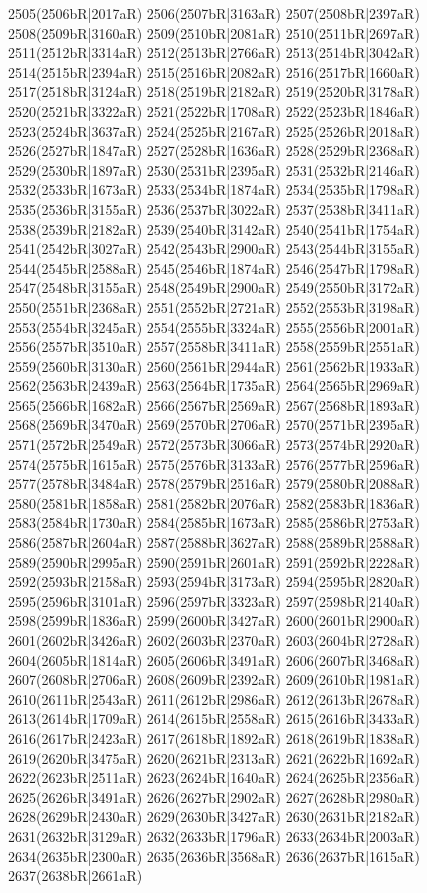 2505(2506bR|2017aR) 2506(2507bR|3163aR) 2507(2508bR|2397aR) 2508(2509bR|3160aR) 2509(2510bR|2081aR) 2510(2511bR|2697aR) \\2511(2512bR|3314aR) 2512(2513bR|2766aR) 2513(2514bR|3042aR) 2514(2515bR|2394aR) 2515(2516bR|2082aR) 2516(2517bR|1660aR) 2517(2518bR|3124aR) 2518(2519bR|2182aR) 2519(2520bR|3178aR) \\2520(2521bR|3322aR) 2521(2522bR|1708aR) 2522(2523bR|1846aR) 2523(2524bR|3637aR) 2524(2525bR|2167aR) 2525(2526bR|2018aR) 2526(2527bR|1847aR) 2527(2528bR|1636aR) 2528(2529bR|2368aR) \\2529(2530bR|1897aR) 2530(2531bR|2395aR) 2531(2532bR|2146aR) 2532(2533bR|1673aR) 2533(2534bR|1874aR) 2534(2535bR|1798aR) 2535(2536bR|3155aR) 2536(2537bR|3022aR) 2537(2538bR|3411aR) \\2538(2539bR|2182aR) 2539(2540bR|3142aR) 2540(2541bR|1754aR) 2541(2542bR|3027aR) 2542(2543bR|2900aR) 2543(2544bR|3155aR) 2544(2545bR|2588aR) 2545(2546bR|1874aR) 2546(2547bR|1798aR) \\2547(2548bR|3155aR) 2548(2549bR|2900aR) 2549(2550bR|3172aR) 2550(2551bR|2368aR) 2551(2552bR|2721aR) 2552(2553bR|3198aR) 2553(2554bR|3245aR) 2554(2555bR|3324aR) 2555(2556bR|2001aR) \\2556(2557bR|3510aR) 2557(2558bR|3411aR) 2558(2559bR|2551aR) 2559(2560bR|3130aR) 2560(2561bR|2944aR) 2561(2562bR|1933aR) 2562(2563bR|2439aR) 2563(2564bR|1735aR) 2564(2565bR|2969aR) \\2565(2566bR|1682aR) 2566(2567bR|2569aR) 2567(2568bR|1893aR) 2568(2569bR|3470aR) 2569(2570bR|2706aR) 2570(2571bR|2395aR) 2571(2572bR|2549aR) 2572(2573bR|3066aR) 2573(2574bR|2920aR) \\2574(2575bR|1615aR) 2575(2576bR|3133aR) 2576(2577bR|2596aR) 2577(2578bR|3484aR) 2578(2579bR|2516aR) 2579(2580bR|2088aR) 2580(2581bR|1858aR) 2581(2582bR|2076aR) 2582(2583bR|1836aR) \\2583(2584bR|1730aR) 2584(2585bR|1673aR) 2585(2586bR|2753aR) 2586(2587bR|2604aR) 2587(2588bR|3627aR) 2588(2589bR|2588aR) 2589(2590bR|2995aR) 2590(2591bR|2601aR) 2591(2592bR|2228aR) \\2592(2593bR|2158aR) 2593(2594bR|3173aR) 2594(2595bR|2820aR) 2595(2596bR|3101aR) 2596(2597bR|3323aR) 2597(2598bR|2140aR) 2598(2599bR|1836aR) 2599(2600bR|3427aR) 2600(2601bR|2900aR) \\2601(2602bR|3426aR) 2602(2603bR|2370aR) 2603(2604bR|2728aR) 2604(2605bR|1814aR) 2605(2606bR|3491aR) 2606(2607bR|3468aR) 2607(2608bR|2706aR) 2608(2609bR|2392aR) 2609(2610bR|1981aR) \\2610(2611bR|2543aR) 2611(2612bR|2986aR) 2612(2613bR|2678aR) 2613(2614bR|1709aR) 2614(2615bR|2558aR) 2615(2616bR|3433aR) 2616(2617bR|2423aR) 2617(2618bR|1892aR) 2618(2619bR|1838aR) \\2619(2620bR|3475aR) 2620(2621bR|2313aR) 2621(2622bR|1692aR) 2622(2623bR|2511aR) 2623(2624bR|1640aR) 2624(2625bR|2356aR) 2625(2626bR|3491aR) 2626(2627bR|2902aR) 2627(2628bR|2980aR) \\2628(2629bR|2430aR) 2629(2630bR|3427aR) 2630(2631bR|2182aR) 2631(2632bR|3129aR) 2632(2633bR|1796aR) 2633(2634bR|2003aR) 2634(2635bR|2300aR) 2635(2636bR|3568aR) 2636(2637bR|1615aR) \\2637(2638bR|2661aR) 